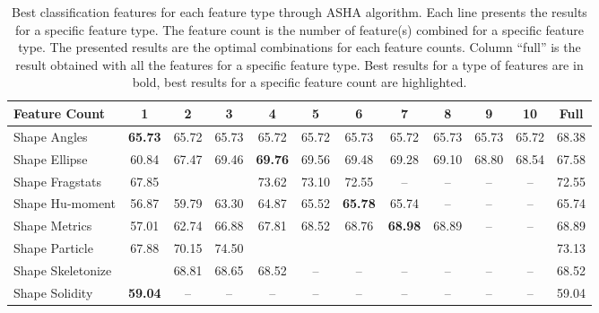 \documentclass[../thesis.tex]{subfiles}
\begin{document}
    \begin{table}[H]
        \centering
        \addtolength{\tabcolsep}{-4pt}
        \begin{tabular}{l c c c c c c c c c c | c}
            \hline
            \textbf{Feature Count} & \textbf{1} & \textbf{2} & \textbf{3} & \textbf{4} &
            \textbf{5} & \textbf{6} & \textbf{7} & \textbf{8} & \textbf{9} & \textbf{10} & \textbf{Full} \\
            \hline
            Shape Angles        & \textbf{65.73} & 65.72 & 65.73 & 65.72 & 65.72 & 65.73 & 65.72 & 65.73 & 65.73 & 65.72 & 68.38 \\
            Shape Ellipse       & 60.84 & 67.47 & 69.46 & \textbf{69.76} & 69.56 & 69.48 & 69.28 & 69.10 & 68.80 & 68.54 & 67.58 \\
            Shape Fragstats     & 67.85 & \cellcolor{green!30}{70.10} & \cellcolor{green!30}{\textbf{74.83}} & 73.62 & 73.10 & 72.55 &   --  &   --  &   --  &   --  & 72.55 \\
            Shape Hu-moment     & 56.87 & 59.79 & 63.30 & 64.87 & 65.52 & \textbf{65.78} & 65.74 &   --  &   --  &   --  & 65.74 \\
            Shape Metrics       & 57.01 & 62.74 & 66.88 & 67.81 & 68.52 & 68.76 & \textbf{68.98} & 68.89 &   --  &   --  & 68.89 \\
            Shape Particle      & 67.88 & 70.15 & 74.50 & \cellcolor{green!30}{\textbf{76.08}} & \cellcolor{green!30}{76.04} & \cellcolor{green!30}{75.99} & \cellcolor{green!30}{76.03} & \cellcolor{green!30}{75.95} & \cellcolor{green!30}{75.83} & \cellcolor{green!30}{75.73} & 73.13 \\
            Shape Skeletonize   & \cellcolor{green!30}{\textbf{68.81}} & 68.81 & 68.65 & 68.52 &   --  &   --  &   --  &   --  &   --  &   --  & 68.52 \\
            Shape Solidity      & \textbf{59.04} &   --  &   --  &   --  &   --  &   --  &   --  &   --  &   --  &   --  & 59.04 \\
            \hline
        \end{tabular}
        \addtolength{\tabcolsep}{4pt}
        \caption{Best classification features for each feature type through ASHA algorithm. Each line presents the results for a specific feature type. The feature count is the number of feature(s) combined for a specific feature type. The presented results are the optimal combinations for each feature counts. Column ``full'' is the result obtained with all the features for a specific feature type. Best results for a type of features are in bold, best results for a specific feature count are highlighted.}
        \label{tab:fv-subset-shape}
    \end{table}
    
\end{document}
